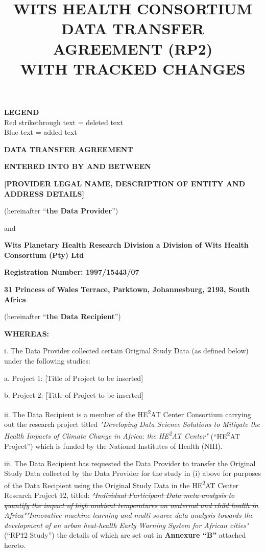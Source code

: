 \documentclass[12pt,letterpaper]{article}
\title{\textbf{WITS HEALTH CONSORTIUM\\DATA TRANSFER AGREEMENT (RP2)\\WITH TRACKED CHANGES}}
\author{}
\date{}
\newcommand{\deleted}[1]{\textcolor{deletecolor}{\sout{#1}}}
\newcommand{\added}[1]{\textcolor{addcolor}{#1}}
\begin{document}
\maketitle

\begin{center}
\textbf{LEGEND}\\
\textcolor{deletecolor}{Red strikethrough text} = deleted text\\
\textcolor{addcolor}{Blue text} = added text
\end{center}

\vspace{1cm}

\begin{center}
\textbf{\Large DATA TRANSFER AGREEMENT}
\end{center}

\textbf{ENTERED INTO BY AND BETWEEN}

\textbf{[PROVIDER LEGAL NAME, DESCRIPTION OF ENTITY AND ADDRESS DETAILS]}

(hereinafter ``\textbf{the Data Provider}'')

and

\textbf{Wits Planetary Health Research Division a Division of Wits Health Consortium (Pty) Ltd}

\textbf{Registration Number: 1997/15443/07}

\textbf{31 Princess of Wales Terrace, Parktown, Johannesburg, 2193, South Africa}

(hereinafter ``\textbf{the Data Recipient}'')

\textbf{WHEREAS:}

i. The Data Provider collected certain Original Study Data (as defined below) under the following studies:

a. Project 1: [Title of Project to be inserted]

b. Project 2: [Title of Project to be inserted]

ii. The Data Recipient is a member of the HE\textsuperscript{2}AT Center Consortium carrying out the research project titled \textit{"Developing Data Science Solutions to Mitigate the Health Impacts of Climate Change in Africa: the HE\textsuperscript{2}AT Center"} (``HE\textsuperscript{2}AT Project'') which is funded by the National Institutes of Health (NIH).

iii. The Data Recipient has requested the Data Provider to transfer the Original Study Data collected by the Data Provider for the study in (i) above for purposes of the Data Recipient using the Original Study Data in the HE\textsuperscript{2}AT Center Research Project \deleted{1}\added{2}, titled: \deleted{\textit{"Individual Participant Data meta-analysis to quantify the impact of high ambient temperatures on maternal and child health in Africa"}}\added{\textit{"Innovative machine learning and multi-source data analysis towards the development of an urban heat-health Early Warning System for African cities"}} (``RP\deleted{1}\added{2} Study'') the details of which are set out in \textbf{Annexure ``B''} attached hereto.
\end{document}
